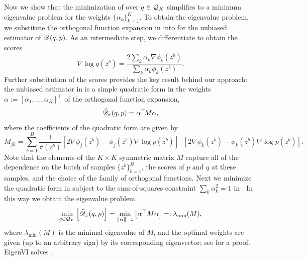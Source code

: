 Now we show that the minimization of  over
$q\in\mathcal{Q}_K$ simplifies to a minimum eigenvalue problem for the weights
$\{\alpha_k\}_{k=1}^{K}$.
To obtain the eigenvalue problem, we substitute the
orthogonal function expansion in 
into  for the unbiased estimator of
$\mathscr{D}(q,p)$. As an intermediate step, we differentiate
 to obtain the scores
\begin{equation}
\label{eq:scores}
\nabla\log q(z^b) = \frac{2\sum_k \alpha_k \nabla \phi_k(z^b)}{\sum_k \alpha_k \phi_k(z^b)}.
\end{equation}
Further substitution of the scores provides the key result behind our
approach: the unbiased estimator in
 is a simple quadratic form in the
weights $\alpha := [\alpha_1,\ldots,\alpha_K]^\top$ of the orthogonal function expansion,
\begin{equation}
\widehat{\mathscr{D}}_{\pi}(q,p) =
\alpha^\top\! M\alpha,
\label{eq:quadform}
\end{equation}
where the coefficients of the quadratic form are given by
\begin{equation} \label{eq:M}
  M_{jk} = \sum_{b=1}^B\frac{1}{\pi(z^b)}
    \left[2\nabla \phi_j(z^b) - \phi_j(z^b)\nabla\log p(z^b)\right]\cdot\left[2\nabla \phi_k(z^b) -
    \phi_k(z^b)\nabla\log p(z^b)\right].
\end{equation}
Note that the elements of the $K\!\times\! K$ symmetric matrix $M$ capture all of the dependence on
the batch of samples $\{z^b\}_{b=1}^B$, the scores of $p$ and $q$ at these samples,
and
the choice of the family of orthogonal functions.
Next we minimize the quadratic
form in  subject to the sum-of-squares
constraint $\sum_k \alpha_k^2 = 1$ in .
In this way we obtain the eigenvalue problem~\citep{courant1924methoden}
\begin{align}
  \label{eq:eigenVI-solution}
\min_{q\in\mathcal{Q}_K}\left[\widehat{\mathscr{D}}_{\pi}(q,p)\right] =
  \min_{\|\alpha\|=1}
  \left[\alpha^\top M\alpha\right] =:
  \lambda_{\text{min}}(M),
\end{align}
where $\lambda_{\text{min}}(M)$ is the minimal eigenvalue of $M$,  and the
optimal weights are given (up to an arbitrary sign) by its
corresponding eigenvector; see  for a proof.
EigenVI solves .

